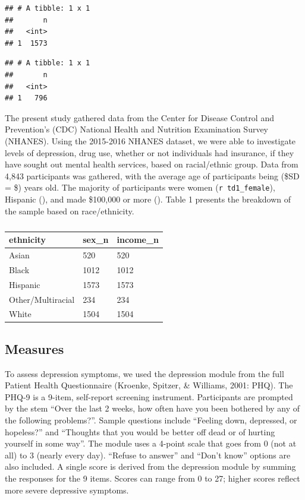 \documentclass[man]{apa6}
\begin{document}
\begin{verbatim}
## # A tibble: 1 x 1
##       n
##   <int>
## 1  1573
\end{verbatim}

\begin{verbatim}
## # A tibble: 1 x 1
##       n
##   <int>
## 1   796
\end{verbatim}

The present study gathered data from the Center for Disease Control and
Prevention's (CDC) National Health and Nutrition Examination Survey
(NHANES). Using the 2015-2016 NHANES dataset, we were able to
investigate levels of depression, drug use, whether or not individuals
had insurance, if they have sought out mental health services, based on
racial/ethnic group. Data from 4,843 participants was gathered, with the
average age of participants being (\$SD = \$) years old. The majority of
participants were women (\texttt{r\ td1\_female}), Hispanic (), and made
\$100,000 or more (). Table 1 presents the breakdown of the sample based
on race/ethnicity.

\begin{table}[tbp]
\begin{center}
\begin{threeparttable}
\caption{\label{tab:apa table}}
\begin{tabular}{lll}
\toprule
ethnicity & \multicolumn{1}{c}{sex\_n} & \multicolumn{1}{c}{income\_n}\\
\midrule
Asian & 520 & 520\\
Black & 1012 & 1012\\
Hispanic & 1573 & 1573\\
Other/Multiracial & 234 & 234\\
White & 1504 & 1504\\
\bottomrule
\end{tabular}
\end{threeparttable}
\end{center}
\end{table}

\subsection{Measures}\label{measures}

To assess depression symptoms, we used the depression module from the
full Patient Health Questionnaire (Kroenke, Spitzer, \& Williams, 2001:
PHQ). The PHQ-9 is a 9-item, self-report screening instrument.
Participants are prompted by the stem \enquote{Over the last 2 weeks,
how often have you been bothered by any of the following problems?}.
Sample questions include \enquote{Feeling down, depressed, or hopeless?}
and \enquote{Thoughts that you would be better off dead or of hurting
yourself in some way}. The module uses a 4-point scale that goes from 0
(not at all) to 3 (nearly every day). \enquote{Refuse to answer} and
\enquote{Don't know} options are also included. A single score is
derived from the depression module by summing the responses for the 9
items. Scores can range from 0 to 27; higher scores reflect more severe
depressive symptoms.
\end{document}
